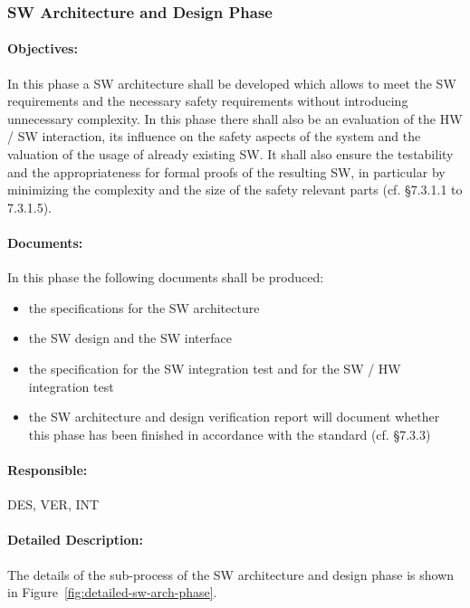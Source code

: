 \subsubsection{SW Architecture and Design Phase}
\label{sec:sw-arch-design}


\paragraph{Objectives:}
\label{sec:sw-arch-objectives}
In this phase a SW architecture shall be developed which allows to meet the SW
requirements and the necessary safety requirements without introducing
unnecessary complexity. In this phase there shall also be an evaluation of the
HW / SW interaction, its influence on the safety aspects of the system and the
valuation of the usage of already existing SW. It shall also ensure the
testability and the appropriateness for formal proofs of the resulting SW, in
particular by minimizing the complexity and the size of the safety relevant
parts (cf. §7.3.1.1 to 7.3.1.5).



\paragraph{Documents:}
\label{sec:sw-arch-documents}
In this phase the following documents shall be produced: 
\begin{itemize}
\item the
specifications for the SW architecture
\item the SW design and the SW interface
\item the specification for the SW integration test and for the SW
/ HW integration test
\item the SW architecture and design verification
report will document whether this phase has been finished in accordance with
the standard (cf. §7.3.3)
\end{itemize} 

\paragraph{Responsible:}
\label{sec:sw-arch-responsible}
DES, VER, INT

\paragraph{Detailed Description:}
\label{sec:sw-arch-deta-descr}
The details of the sub-process of the SW architecture and design phase is shown
in Figure~\ref{fig:detailed-sw-arch-phase}.

